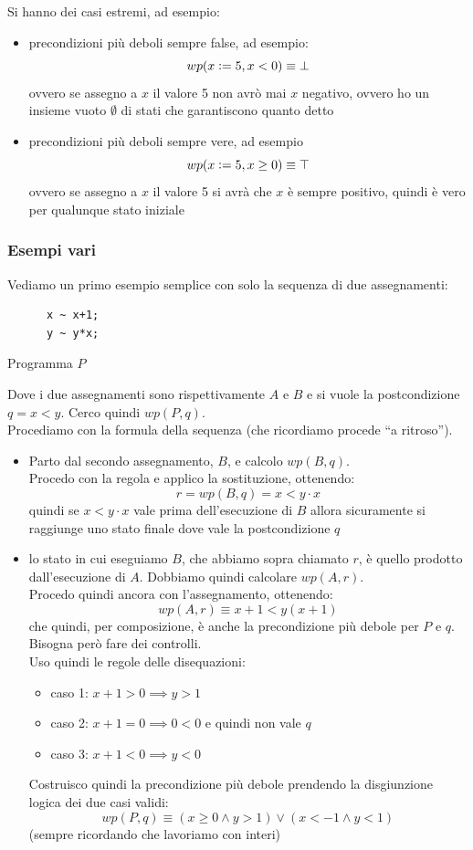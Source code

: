\documentclass[a4paper,12pt, oneside]{book}
\def\cceq{\mathrel{\vcenter{\hbox{:}}{=}}}
\begin{document}
Si hanno dei casi estremi, ad esempio:
\begin{itemize}
  \item precondizioni più deboli sempre false, ad esempio:
  \[wp(x\cceq5,x<0)\equiv\bot\]
  ovvero se assegno a $x$ il valore 5 non avrò mai $x$ negativo,
  ovvero ho un insieme vuoto $\emptyset$ di stati che garantiscono quanto detto
  \item precondizioni più deboli sempre vere, ad esempio
  \[wp(x\cceq 5,x\geq0)\equiv\top\]
  ovvero se assegno a $x$ il valore 5 si avrà che $x$ è sempre
  positivo, quindi è vero per qualunque stato iniziale
\end{itemize}
\subsubsection{Esempi vari}
\begin{esempio}
  Vediamo un primo esempio semplice con solo la sequenza di due assegnamenti:
  \begin{listing}[H]
    \begin{lstlisting}
      x ~ x+1;
      y ~ y*x;
    \end{lstlisting}
    \caption{Programma $P$}
  \end{listing}
  Dove i due assegnamenti sono rispettivamente $A$ e $B$ e si vuole la
  postcondizione $q=x<y$. Cerco quindi $wp(P,q)$.\\
  Procediamo con la formula della sequenza (che ricordiamo procede ``a
  ritroso'').
  \begin{itemize}
    \item Parto dal secondo assegnamento, $B$, e calcolo $wp(B,q)$.\\
    Procedo con la regola e applico la sostituzione, ottenendo:
    \[r=wp(B,q)=x<y\cdot x\]
    quindi se $x<y\cdot x$ vale prima dell'esecuzione di $B$ allora sicuramente
    si raggiunge uno stato finale dove vale la postcondizione $q$ 
    \item lo stato in cui eseguiamo $B$, che abbiamo sopra chiamato $r$, è
    quello prodotto dall'esecuzione di $A$. Dobbiamo quindi calcolare
    $wp(A,r)$.\\
    Procedo quindi ancora con l'assegnamento, ottenendo:
    \[wp(A,r)\equiv x+1<y(x+1)\]
    che quindi, per composizione, è anche la precondizione più debole per $P$ e
    $q$. Bisogna però fare dei controlli.\\
    Uso quindi le regole delle disequazioni:
    \begin{itemize}
      \item caso 1: $x+1>0\implies y>1$
      \item caso 2: $x+1=0\implies 0<0$ e quindi non vale $q$
      \item caso 3: $x+1<0\implies y<0$
    \end{itemize}
    Costruisco quindi la precondizione più debole prendendo la disgiunzione
    logica dei due casi validi:
    \[wp(P,q)\equiv(x\geq 0\land y>1)\lor (x<-1\land y<1)\]
    (sempre ricordando che lavoriamo con interi)
  \end{itemize}
\end{esempio}
\end{document}
